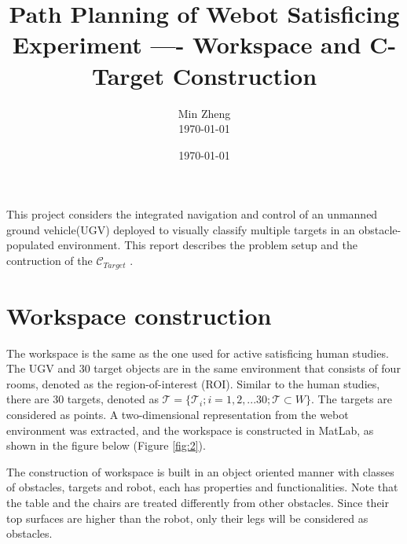 \documentclass[12pt,draftcls,onecolumn]{IEEEtran}
\begin{document}
\title{Path Planning of Webot Satisficing Experiment ---- Workspace and C-Target Construction  }


\author{  Min Zheng \\  \today}

\date{\today}

\maketitle




This project considers the integrated navigation and control of an unmanned ground vehicle(UGV) deployed to visually classify multiple targets in an obstacle-populated environment. 
This report describes the problem setup and the contruction of the $\mathcal{C}_{Target}$ . 

\section{Workspace construction} 

The workspace is the same as the one used for active satisficing human studies. 
The UGV and 30 target objects are in the same environment that consists of four rooms, denoted as the region-of-interest (ROI).
Similar to the human studies, there are 30 targets, denoted as $\mathcal{T} = \{\mathcal{T}_i; i = 1,2,...30; \mathcal{T} \subset W \}$.
The targets are considered as points.
A two-dimensional representation from the webot environment was extracted, and the workspace is constructed in MatLab, as shown in the figure below  (Figure \ref{fig:2}). 


The construction of workspace is built in an object oriented manner with classes of obstacles, targets and robot, each has properties and functionalities.  
Note that the table and the chairs are treated differently from other obstacles.
Since their top surfaces are higher than the robot, only their legs will be considered as obstacles. 
\end{document}
